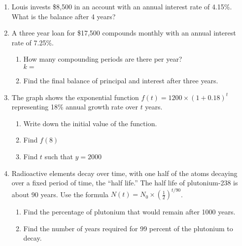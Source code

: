 \begin{enumerate}
\item Louis invests \$8,500 in an account with an annual interest rate of 4.15\%. What is the balance after 4 years? \vspace{2cm}

\item A three year loan for \$17,500 compounds monthly with an annual interest rate of 7.25\%.
\begin{enumerate}[itemsep=0.5cm]
    \item How many compounding periods are there per year? \\[0.25cm]
    $k=$
    \item Find the final balance of principal and interest after three years.
\end{enumerate} \vspace{2cm}

\item The graph shows the exponential function $\displaystyle f(t)=1200 \times \left( 1+0.18 \right)^t$ representing 18\% annual growth rate over $t$ years.
\begin{multicols}{2}
    \begin{enumerate}[itemsep=1cm]
        \item Write down the initial value of the function.
        \item Find $f(8)$
        \item Find $t$ such that $y=2000$
    \end{enumerate}
    \begin{center}
    \end{center}
    \end{multicols}

\newpage
\item Radioactive elements decay over time, with one half of the atoms decaying over a fixed period of time, the ``half life.'' The half life of plutonium-238 is about 90 years. Use the formula $\displaystyle N(t)=N_0 \times \left( \frac{1}{2} \right)^{t/90}$. 
\begin{enumerate}[itemsep=1.5cm]
    \item Find the percentage of plutonium that would remain after 1000 years.
    \item Find the number of years required for 99 percent of the plutonium to decay.
\end{enumerate}



\end{enumerate}
